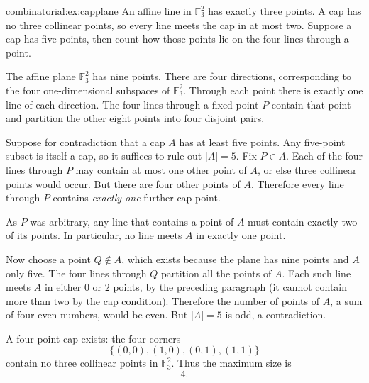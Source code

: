 \begin{solution}{combinatorial:ex:capplane}
\idea An affine line in $\mathbb F_3^2$ has exactly three points. A cap has no three collinear points, so every line meets the cap in at most two. Suppose a cap has five points, then count how those points lie on the four lines through a point.

\writeup The affine plane $\mathbb F_3^2$ has nine points. There are four directions, corresponding to the four one-dimensional subspaces of $\mathbb F_3^2$. Through each point there is exactly one line of each direction. The four lines through a fixed point $P$ contain that point and partition the other eight points into four disjoint pairs.

Suppose for contradiction that a cap $A$ has at least five points. Any five-point subset is itself a cap, so it suffices to rule out $|A|=5$. Fix $P\in A$. Each of the four lines through $P$ may contain at most one other point of $A$, or else three collinear points would occur. But there are four other points of $A$. Therefore every line through $P$ contains \emph{exactly one} further cap point.

As $P$ was arbitrary, any line that contains a point of $A$ must contain exactly two of its points. In particular, no line meets $A$ in exactly one point.

Now choose a point $Q\notin A$, which exists because the plane has nine points and $A$ only five. The four lines through $Q$ partition all the points of $A$. Each such line meets $A$ in either $0$ or $2$ points, by the preceding paragraph (it cannot contain more than two by the cap condition). Therefore the number of points of $A$, a sum of four even numbers, would be even. But $|A|=5$ is odd, a contradiction.

A four-point cap exists: the four corners
\[
\{(0,0),(1,0),(0,1),(1,1)\}
\]
contain no three collinear points in $\mathbb F_3^2$. Thus the maximum size is
\[
\boxed{4}.
\]
\end{solution}

